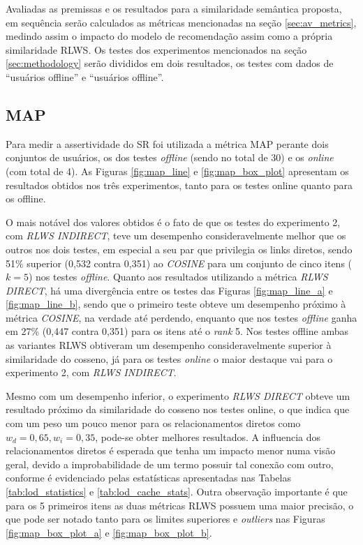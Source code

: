 Avaliadas as premissas e os resultados para a similaridade semântica proposta, em sequência serão calculados as métricas mencionadas na seção \ref{sec:av_metrics}, medindo assim o impacto do modelo de recomendação assim como a própria similaridade \ac{RLWS}. Os testes dos experimentos mencionados na seção \ref{sec:methodology} serão divididos em dois resultados, os testes com dados de \enquote{usuários offline} e \enquote{usuários offline}.

\subsection{MAP}

Para medir a assertividade do \ac{SR} foi utilizada a métrica \ac{MAP} perante dois conjuntos de usuários, os dos testes \textit{offline} (sendo no total de 30) e os \textit{online} (com total de 4). As Figuras \ref{fig:map_line} e \ref{fig:map_box_plot} apresentam os resultados obtidos nos três experimentos, tanto para os testes online quanto para os offline. 

O mais notável dos valores obtidos é o fato de que os testes do experimento 2, com \textit{RLWS INDIRECT}, teve um desempenho consideravelmente melhor que os outros nos dois testes, em especial a seu par que privilegia os links diretos, sendo 51\% superior (0,532 contra 0,351) ao \textit{COSINE} para um conjunto de cinco itens ($k=5$) nos testes \textit{offline}. Quanto aos resultados utilizando a métrica \textit{RLWS DIRECT}, há uma divergência entre os testes das Figuras \ref{fig:map_line_a} e \ref{fig:map_line_b}, sendo que o primeiro teste obteve um desempenho próximo à métrica \textit{COSINE}, na verdade até perdendo, enquanto que nos testes \textit{offline} ganha em 27\% (0,447 contra 0,351) para os itens até o \textit{rank} 5. Nos testes offline ambas as variantes \ac{RLWS} obtiveram um desempenho consideravelmente superior à similaridade do cosseno, já para os testes \textit{online} o maior destaque vai para o experimento 2, com \textit{RLWS INDIRECT}.

Mesmo com um desempenho inferior, o experimento \textit{RLWS DIRECT} obteve um resultado próximo da similaridade do cosseno nos testes online, o que indica que com um peso um pouco menor para os relacionamentos diretos como $w_d = 0,65, w_i = 0,35$, pode-se obter melhores resultados. A influencia dos relacionamentos diretos é esperada que tenha um impacto menor numa visão geral, devido a improbabilidade de um termo possuir tal conexão com outro, conforme é evidenciado pelas estatísticas apresentadas nas Tabelas \ref{tab:lod_statistics} e \ref{tab:lod_cache_stats}. Outra observação importante é que para os 5 primeiros itens as duas métricas \ac{RLWS} possuem uma maior precisão, o que pode ser notado tanto para os limites superiores e \textit{outliers} nas Figuras \ref{fig:map_box_plot_a} e \ref{fig:map_box_plot_b}.

